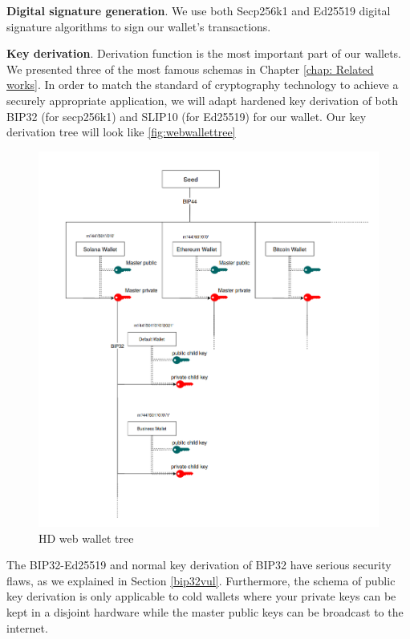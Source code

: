 \bigskip
{\textbf{Digital signature generation}}. We use both Secp256k1 and Ed25519 digital signature algorithms to sign our wallet’s transactions.

\bigskip
{\textbf{Key derivation}}. Derivation function is the most important part of our wallets. We presented three of the most famous schemas in Chapter \ref{chap: Related works}. In order to match the standard of cryptography technology to achieve a securely appropriate application, we will adapt hardened key derivation of both BIP32 (for secp256k1) and SLIP10 (for Ed25519) for our wallet.
Our key derivation tree will look like \autoref{fig:webwallettree}

\begin{figure}[!ht]
    \centering
    \includegraphics[width=1\textwidth]{images/tree_web_wallet.png}
    \caption[HD web wallet tree]{HD web wallet tree}
    \label{fig:webwallettree}
\end{figure}

The BIP32-Ed25519 and normal key derivation of BIP32 have serious security flaws, as we explained in Section \ref{bip32vul}. Furthermore, the schema of public key derivation is only applicable to cold wallets where your private keys can be kept in a disjoint hardware while the master public keys can be broadcast to the internet.


